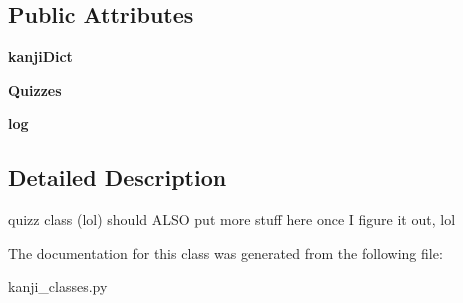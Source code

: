 \subsection*{Public Attributes}
\begin{DoxyCompactItemize}
\item 
\mbox{\label{classkanji__classes_1_1quizz_a7b784a1e255eabf256294695f63b55c5}} 
{\bfseries kanji\+Dict}
\item 
\mbox{\label{classkanji__classes_1_1quizz_a68e3a707e0d9f77f414bb2a7fe629a68}} 
{\bfseries Quizzes}
\item 
\mbox{\label{classkanji__classes_1_1quizz_a4d0a1b39e9c6796588648ce3b21cee5d}} 
{\bfseries log}
\end{DoxyCompactItemize}


\subsection{Detailed Description}
quizz class (lol) should A\+L\+SO put more stuff here once I figure it out, lol 

The documentation for this class was generated from the following file\+:\begin{DoxyCompactItemize}
\item 
kanji\+\_\+classes.\+py\end{DoxyCompactItemize}
